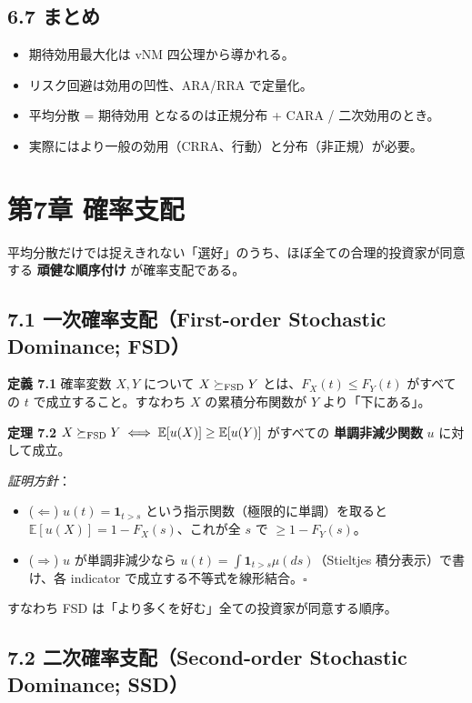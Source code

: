 \documentclass[11pt,a4paper]{report}
\begin{document}
\section{6.7 まとめ}

\begin{itemize}
\item 期待効用最大化は vNM 四公理から導かれる。
\item リスク回避は効用の凹性、ARA/RRA で定量化。
\item 平均分散 = 期待効用 となるのは正規分布 + CARA / 二次効用のとき。
\item 実際にはより一般の効用（CRRA、行動）と分布（非正規）が必要。
\end{itemize}

\noindent\hrulefill

\chapter{第7章 確率支配}

平均分散だけでは捉えきれない「選好」のうち、ほぼ全ての合理的投資家が同意する \textbf{頑健な順序付け} が確率支配である。

\section{7.1 一次確率支配（First-order Stochastic Dominance; FSD）}

\textbf{定義 7.1} 確率変数 $X, Y$ について $X \succeq_{\rm FSD} Y$ とは、$F_X(t) \le F_Y(t)$ がすべての $t$ で成立すること。すなわち $X$ の累積分布関数が $Y$ より「下にある」。

\textbf{定理 7.2} $X \succeq_{\rm FSD} Y \iff \mathbb{E}[u(X)] \ge \mathbb{E}[u(Y)]$ がすべての \textbf{単調非減少関数} $u$ に対して成立。

\emph{証明方針}：
\begin{itemize}
\item ($\Leftarrow$) $u(t) = \mathbf{1}_{t > s}$ という指示関数（極限的に単調）を取ると $\mathbb{E}[u(X)] = 1 - F_X(s)$、これが全 $s$ で $\ge 1 - F_Y(s)$。
\item ($\Rightarrow$) $u$ が単調非減少なら $u(t) = \int \mathbf{1}_{t > s} \mu(ds)$（Stieltjes 積分表示）で書け、各 indicator で成立する不等式を線形結合。$\square$
\end{itemize}

すなわち FSD は「より多くを好む」全ての投資家が同意する順序。

\section{7.2 二次確率支配（Second-order Stochastic Dominance; SSD）}
\end{document}
